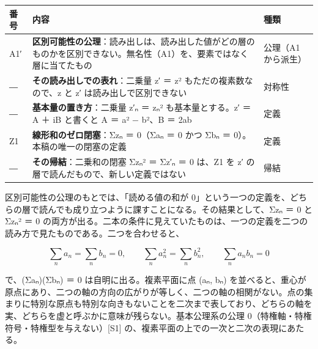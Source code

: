 \documentclass[
  a4paper,
]{ltjsarticle}
\newcounter{none} %
\begin{document}
{\def\LTcaptype{none} %
\begin{longtable}[]{@{}
  >{\raggedright\arraybackslash}p{}
  >{\raggedright\arraybackslash}p{}
  >{\raggedright\arraybackslash}p{}@{}}
\toprule\noalign{}
\begin{minipage}[b]{\linewidth}\raggedright
番号
\end{minipage} & \begin{minipage}[b]{\linewidth}\raggedright
内容
\end{minipage} & \begin{minipage}[b]{\linewidth}\raggedright
種類
\end{minipage} \\
\midrule\noalign{}
\endhead
\bottomrule\noalign{}
\endlastfoot
A1′ &
\textbf{区別可能性の公理}：読み出しは、読み出した値がどの層のものかを区別できない。無名性（A1）を、要素ではなく層に当てたもの
& 公理（A1 から派生） \\
― & \textbf{その読み出しでの表れ}：二乗量 z′ ＝ z²
もただの複素数なので、z と z′ は読み出しで区別できない & 対称性 \\
― & \textbf{基本量の置き方}：二乗量 z′ₙ ＝ zₙ² も基本量とする。z′ ＝ A
＋ iB と書くと A ＝ a² − b²、B ＝ 2ab & 定義 \\
Z1 & \textbf{線形和のゼロ閉塞}：Σzₙ ＝ 0（Σaₙ ＝ 0 かつ Σbₙ ＝
0）。本稿の唯一の閉塞の定義 & 定義 \\
― & \textbf{その帰結}：二乗和の閉塞 Σzₙ² ＝ Σz′ₙ ＝ 0 は、Z1 を z′
の層で読んだもので、新しい定義ではない & 帰結 \\
\end{longtable}
}

区別可能性の公理のもとでは、「読める値の和が
0」という一つの定義を、どちらの層で読んでも成り立つように課すことになる。その結果として、Σzₙ
＝ 0 と Σzₙ² ＝ 0
の両方が出る。二本の条件に見えていたものは、一つの定義を二つの読み方で見たものである。二つを合わせると、

\[
\sum_n a_n=\sum_n b_n=0,\qquad \sum_n a_n^2=\sum_n b_n^2,\qquad \sum_n a_nb_n=0
\]

で、(Σaₙ)(Σbₙ) ＝ 0 は自明に出る。複素平面に点 (aₙ, bₙ)
を並べると、重心が原点にあり、二つの軸の方向の広がりが等しく、二つの軸の相関がない。点の集まりに特別な原点も特別な向きもないことを二次まで表しており、どちらの軸を実、どちらを虚と呼ぶかに意味が残らない。基本公理系の公理
0（特権軸・特権符号・特権型を与えない）{[}S1{]}
の、複素平面の上での一次と二次の表現にあたる。
\end{document}
